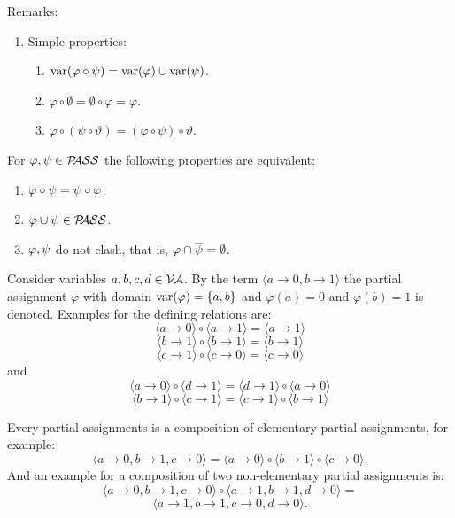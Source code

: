 \documentclass[]{book}
\begin{document}
Remarks:
\begin{enumerate}
      \item Simple properties:
      \begin{enumerate}
            \item $\operatorname{var}(\varphi \circ \psi)  = \operatorname{var}(\varphi)\cup \operatorname{var}(\psi)$.
            \item $\varphi \circ \emptyset  = \emptyset \circ \varphi = \varphi$.
            \item $\varphi \circ (\psi \circ \vartheta) = (\varphi \circ \psi) \circ \vartheta$.
      \end{enumerate}
\end{enumerate}
\begin{lem}\label{lem:comcomp}
  For $\varphi, \psi \in \mathcal{P\hspace{-0.32em}ASS}$ the following properties are equivalent:
  \begin{enumerate}
  \item $\varphi \circ \psi = \psi \circ \varphi$.
  \item $\varphi \cup \psi \in \mathcal{P\hspace{-0.32em}ASS}$.
  \item $\varphi, \psi$ do not clash, that is, $\varphi \cap \overline{\psi} = \emptyset$.
  \end{enumerate}
\end{lem}
\begin{examp}\label{exp:cmp}
      Consider variables $a,b,c,d \in \mathcal{V\hspace{-0.1em}A}$. By the term $\langle a\to 0, b\to 1 \rangle$ the partial assignment $\varphi$ with domain 
	  $\operatorname{var}(\varphi) = \{a, b\}$ and $\varphi(a) = 0$ and $\varphi(b) = 1$ is denoted.
      Examples for the defining relations are:
      $$\langle a\to 0 \rangle \circ \langle a\to 1 \rangle = \langle a\to 1 \rangle $$
      $$\langle b\to 1 \rangle \circ \langle b\to 1 \rangle = \langle b\to 1 \rangle $$
      $$\langle c\to 1 \rangle \circ \langle c\to 0 \rangle = \langle c\to 0 \rangle$$
      and
      $$ \langle a\to 0 \rangle \circ \langle d\to 1 \rangle = \langle d\to 1 \rangle \circ \langle a\to 0 \rangle$$
      $$\langle b\to 1 \rangle \circ \langle c\to 1 \rangle = \langle c\to 1 \rangle \circ \langle b\to 1 \rangle$$
\end{examp}
\begin{examp}\label{exp:cmp2}
      Every partial assignments is a composition of elementary partial assignments, for example:
      $$\langle a\to 0, b\to 1, c\to 0 \rangle = \langle a\to 0 \rangle \circ \langle b\to 1 \rangle \circ \langle c\to 0 \rangle. $$
      And an example for a composition of two non-elementary partial assignments is:
      $$\langle a\to 0, b\to 1, c\to 0 \rangle \circ \langle a\to 1, b\to 1, d\to 0 \rangle = $$
      $$ \langle a\to 1, b\to 1, c\to 0, d\to 0 \rangle.$$
\end{examp}
\end{document}
